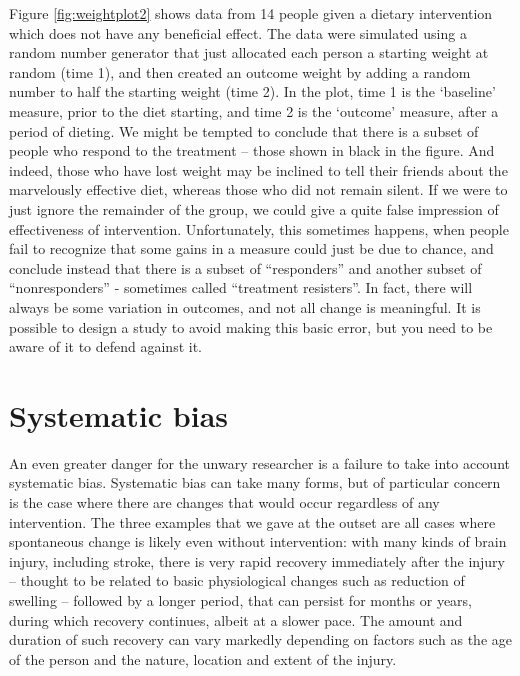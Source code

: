 \documentclass{krantz}
\begin{document}
Figure \ref{fig:weightplot2} shows data from 14 people given a dietary intervention which does not have any beneficial effect. The data were simulated using a random number generator that just allocated each person a starting weight at random (time 1), and then created an outcome weight by adding a random number to half the starting weight (time 2). In the plot, time 1 is the `baseline' measure, prior to the diet starting, and time 2 is the `outcome' measure, after a period of dieting. We might be tempted to conclude that there is a subset of people who respond to the treatment -- those shown in black in the figure. And indeed, those who have lost weight may be inclined to tell their friends about the marvelously effective diet, whereas those who did not remain silent. If we were to just ignore the remainder of the group, we could give a quite false impression of effectiveness of intervention. Unfortunately, this sometimes happens, when people fail to recognize that some gains in a measure could just be due to chance, and conclude instead that there is a subset of ``responders'' and another subset of ``nonresponders'' - sometimes called ``treatment resisters''. In fact, there will always be some variation in outcomes, and not all change is meaningful. It is possible to design a study to avoid making this basic error, but you need to be aware of it to defend against it.

\hypertarget{systematic-bias}{%
\section{Systematic bias}\label{systematic-bias}}

An even greater danger for the unwary researcher is a failure to take into account systematic bias. Systematic bias can take many forms, but of particular concern is the case where there are changes that would occur regardless of any intervention. The three examples that we gave at the outset are all cases where spontaneous change is likely even without intervention: with many kinds of brain injury, including stroke, there is very rapid recovery immediately after the injury -- thought to be related to basic physiological changes such as reduction of swelling -- followed by a longer period, that can persist for months or years, during which recovery continues, albeit at a slower pace. The amount and duration of such recovery can vary markedly depending on factors such as the age of the person and the nature, location and extent of the injury.
\end{document}
